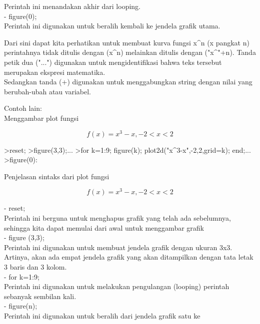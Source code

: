 \documentclass{article}
\begin{document}
\begin{eulernotebook}
\begin{eulercomment}
\begin{eulercomment}
\begin{eulercomment}
\begin{eulercomment}
\begin{eulercomment}
Perintah ini menandakan akhir dari looping.\\
- figure(0);\\
Perintah ini digunakan untuk beralih kembali ke jendela grafik utama.
\end{eulercomment}
\begin{eulercomment}
Dari sini dapat kita perhatikan untuk membuat kurva fungsi x\textasciicircum{}n (x
pangkat n) perintahnya tidak ditulis dengan (x\textasciicircum{}n) melainkan ditulis
dengan ("x\textasciicircum{}"+n). Tanda petik dua ("...") digunakan untuk
mengidentifikasi bahwa teks tersebut merupakan ekspresi matematika.\\
Sedangkan tanda (+) digunakan untuk menggabungkan string dengan nilai
yang berubah-ubah atau variabel.

Contoh lain:\\
Menggambar plot fungsi\\
\end{eulercomment}
\begin{eulerformula}
\[
f(x)=x^3-x, -2<x<2
\]
\end{eulerformula}
\begin{eulerprompt}
>reset;
>figure(3,3);...
>for k=1:9; figure(k); plot2d("x^3-x",-2,2,grid=k); end;...
>figure(0):
\end{eulerprompt}
\begin{eulerttcomment}
 Penjelasan sintaks dari plot fungsi
\end{eulerttcomment}
\begin{eulerformula}
\[
f(x)=x^3-x, -2<x<2
\]
\end{eulerformula}
\begin{eulercomment}
- reset;\\
Perintah ini berguna untuk menghapus grafik yang telah ada sebelumnya,
sehingga kita dapat memulai dari awal untuk menggambar grafik\\
- figure (3,3);\\
Perintah ini digunakan untuk membuat jendela grafik dengan ukuran 3x3.
Artinya, akan ada empat jendela grafik yang akan ditampilkan dengan
tata letak 3 baris dan 3 kolom.\\
- for k=1:9;\\
Perintah ini digunakan untuk melakukan pengulangan (looping) perintah
sebanyak sembilan kali.\\
- figure(n);\\
Perintah ini digunakan untuk beralih dari jendela grafik satu ke\\

\end{eulercomment}
\end{eulercomment}
\end{eulercomment}
\end{eulercomment}
\end{eulercomment}
\end{eulernotebook}
\end{document}
